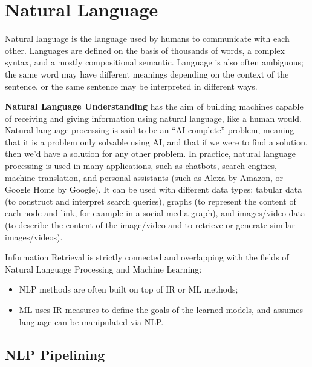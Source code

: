 \chapter{Natural Language}

Natural language is the language used by humans to communicate with each other. Languages are defined on the basis of thousands of words, a complex syntax, and a mostly compositional semantic. Language is also often ambiguous; the same word may have different meanings depending on the context of the sentence, or the same sentence may be interpreted in different ways.

\textbf{Natural Language Understanding} has the aim of building machines capable of receiving and giving information using natural language, like a human would. Natural language processing is said to be an ``AI-complete'' problem, meaning that it is a problem only solvable using AI, and that if we were to find a solution, then we'd have a solution for any other problem. In practice, natural language processing is used in many applications, such as chatbots, search engines, machine translation, and personal assistants (such as Alexa by Amazon, or Google Home by Google). It can be used with different data types: tabular data (to construct and interpret search queries), graphs (to represent the content of each node and link, for example in a social media graph), and images/video data (to describe the content of the image/video and to retrieve or generate similar images/videos).

Information Retrieval is strictly connected and overlapping with the fields of Natural Language Processing and Machine Learning:
\begin{itemize}
    \item NLP methods are often built on top of IR or ML methods;
    \item ML uses IR measures to define the goals of the learned models, and assumes language can be manipulated via NLP.
\end{itemize}

\section{NLP Pipelining}

